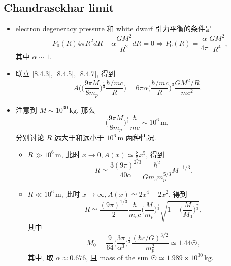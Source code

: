 \subsection{Chandrasekhar limit}
\begin{itemize}
	\item electron degeneracy pressure 和 white dwarf 引力平衡的条件是
	\begin{equation} \label{8.4.7}
		- P_0(R) 4 \pi R^2 dR + \alpha \frac{G M^2}{R^2} dR = 0 \Longrightarrow P_0(R) = \frac{\alpha}{4 \pi} \frac{G M^2}{R^4},
	\end{equation}
	其中 $\alpha \sim 1$.
	
	\item 联立 \eqref{8.4.3}, \eqref{8.4.5}, \eqref{8.4.7}, 得到
	\begin{equation}
		A \Big( \Big( \frac{9 \pi M}{8 m_p} \Big)^{\frac{1}{3}} \frac{\hbar / m c}{R} \Big) = 6 \pi \alpha \Big( \frac{\hbar / m c}{R} \Big)^3 \frac{G M^2 / R}{m c^2}.
	\end{equation}
	
	\item 注意到 $M \sim 10^{30} \, \text{kg}$, 那么
	\begin{equation}
		\Big( \frac{9 \pi M}{8 m_p} \Big)^{\frac{1}{3}} \frac{\hbar}{m c} \sim 10^6 \, \text{m},
	\end{equation}
	分别讨论 $R$ 远大于和远小于 $10^6 \, \text{m}$ 两种情况.
	\begin{itemize}
		\item $R \gg 10^6 \, \text{m}$, 此时 $x \rightarrow 0, A(x) \simeq \frac{8}{5} x^5$, 得到
		\begin{equation}
			R \simeq \frac{3 (9 \pi)^{2 / 3}}{40 \alpha} \frac{\hbar^2}{G m_e m_p^{5 / 3}} M^{- 1 / 3}.
		\end{equation}
		
		\item $R \ll 10^6 \, \text{m}$, 此时 $x \rightarrow \infty, A(x) \simeq 2 x^4 - 2 x^2$, 得到
		\begin{equation}
			R \simeq \frac{(9 \pi)^{1 / 3}}{2} \frac{\hbar}{m_e c} \Big( \frac{M}{m_p} \Big)^{\frac{1}{3}} \sqrt{1 - \Big( \frac{M}{M_0} \Big)^{\frac{2}{3}}},
		\end{equation}
		其中
		\begin{equation}
			M_0 = \frac{9}{64} \Big( \frac{3 \pi}{\alpha^3} \Big)^{\frac{1}{2}} \frac{(\hbar c / G)^{3 / 2}}{m_p^2} \simeq 1.44 \astrosun,
		\end{equation}
		其中, 取 $\alpha \approx 0.676$, 且 mass of the sun $\astrosun \simeq 1.989 \times 10^{30} \, \text{kg}$.
	\end{itemize}
	

\end{itemize}
